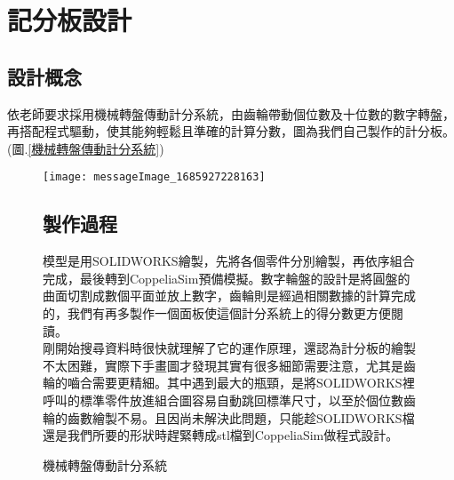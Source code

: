 \chapter{記分板設計}
\section{設計概念}
    依老師要求採用機械轉盤傳動計分系統，由齒輪帶動個位數及十位數的數字轉盤，再搭配程式驅動，使其能夠輕鬆且準確的計算分數，圖為我們自己製作的計分板。(圖.\ref{機械轉盤傳動計分系統})\\
    
\begin{figure}[hbt!]
\center
\texttt{[image: messageImage\_1685927228163]}
\caption{\Large 機械轉盤傳動計分系統}
\label{messageImage_1685927228163}
    
\section{製作過程}

模型是用SOLIDWORKS繪製，先將各個零件分別繪製，再依序組合完成，最後轉到CoppeliaSim預備模擬。數字輪盤的設計是將圓盤的曲面切割成數個平面並放上數字，齒輪則是經過相關數據的計算完成的，我們有再多製作一個面板使這個計分系統上的得分數更方便閱讀。\\
剛開始搜尋資料時很快就理解了它的運作原理，還認為計分板的繪製不太困難，實際下手畫圖才發現其實有很多細節需要注意，尤其是齒輪的嚙合需要更精細。其中遇到最大的瓶頸，是將SOLIDWORKS裡呼叫的標準零件放進組合圖容易自動跳回標準尺寸，以至於個位數齒輪的齒數繪製不易。且因尚未解決此問題，只能趁SOLIDWORKS檔還是我們所要的形狀時趕緊轉成stl檔到CoppeliaSim做程式設計。\\





\end{figure}

